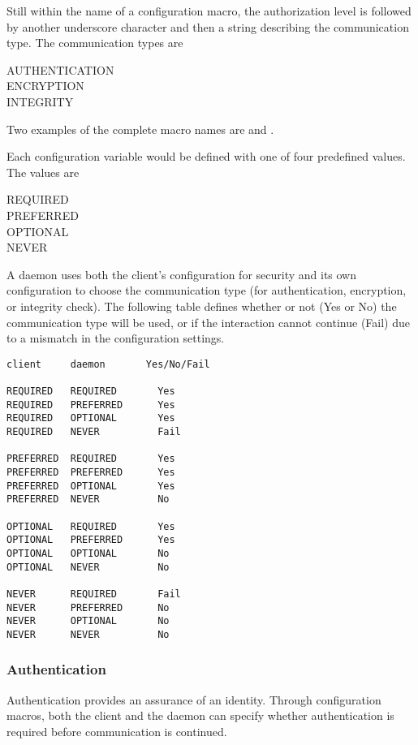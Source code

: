 Still within the name of a configuration macro,
the authorization level is followed by another underscore
character and then a string describing the communication type.
The communication types are
\begin{description}
    \item[AUTHENTICATION]
    \item[ENCRYPTION]
    \item[INTEGRITY]
\end{description}
Two examples of the complete macro names are
and
.

Each configuration variable would be defined with one
of four predefined values.
The values are
\begin{description}
    \item[REQUIRED]
    \item[PREFERRED]
    \item[OPTIONAL]
    \item[NEVER] 
\end{description}

A daemon uses both the client's configuration for security
and its own configuration
to choose the communication type
(for authentication, encryption, or integrity check).
The following table defines whether or not (Yes or No) the
communication type will be used, or if the interaction cannot
continue (Fail) due to a mismatch in the configuration settings.

\begin{verbatim}
client     daemon       Yes/No/Fail

REQUIRED   REQUIRED       Yes
REQUIRED   PREFERRED      Yes
REQUIRED   OPTIONAL       Yes
REQUIRED   NEVER          Fail

PREFERRED  REQUIRED       Yes
PREFERRED  PREFERRED      Yes
PREFERRED  OPTIONAL       Yes
PREFERRED  NEVER          No

OPTIONAL   REQUIRED       Yes
OPTIONAL   PREFERRED      Yes
OPTIONAL   OPTIONAL       No
OPTIONAL   NEVER          No

NEVER      REQUIRED       Fail
NEVER      PREFERRED      No
NEVER      OPTIONAL       No
NEVER      NEVER          No
\end{verbatim}

\subsubsection{\label{sec:Security-Authentication} Authentication}
Authentication provides an assurance of an identity.
Through configuration macros, both the client and the daemon
can specify whether authentication is required before communication
is continued.

